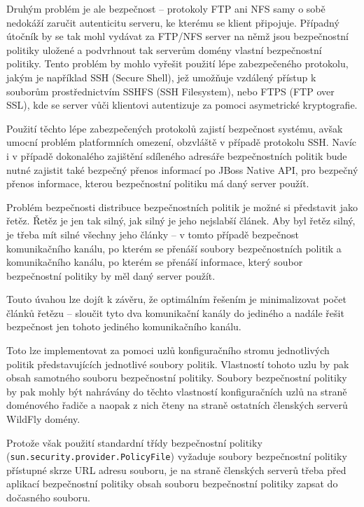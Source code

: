 Druhým problém je ale bezpečnost -- protokoly FTP ani NFS samy o sobě nedokáží zaručit autenticitu serveru, ke kterému se klient připojuje. Případný útočník by se tak mohl vydávat za FTP/NFS server na němž jsou bezpečnostní politiky uložené a podvrhnout tak serverům domény vlastní bezpečnostní politiky. Tento problém by mohlo vyřešit použití lépe zabezpečeného protokolu, jakým je například SSH (Secure Shell), jež umožňuje vzdálený přístup k souborům prostřednictvím SSHFS (SSH Filesystem), nebo FTPS (FTP over SSL), kde se server vůči klientovi autentizuje za pomoci asymetrické kryptografie. \cite[3]{ssh}

Použití těchto lépe zabezpečených protokolů zajistí bezpečnost systému, avšak umocní problém platformních omezení, obzvláště v případě protokolu SSH. Navíc i v případě dokonalého zajištění sdíleného adresáře bezpečnostních politik bude nutné zajistit také bezpečný přenos informací po JBoss Native API, pro bezpečný přenos informace, kterou bezpečnostní politiku má daný server použít.

Problém bezpečnosti distribuce bezpečnostních politik je možné si představit jako řetěz. Řetěz je jen tak silný, jak silný je jeho nejslabší článek. Aby byl řetěz silný, je třeba mít silné všechny jeho články -- v tomto případě bezpečnost komunikačního kanálu, po kterém se přenáší soubory bezpečnostních politik a komunikačního kanálu, po kterém se přenáší informace, který soubor bezpečnostní politiky by měl daný server použít.

Touto úvahou lze dojít k závěru, že optimálním řešením je minimalizovat počet článků řetězu -- sloučit tyto dva komunikační kanály do jediného a nadále řešit bezpečnost jen tohoto jediného komunikačního kanálu.

Toto lze implementovat za pomoci uzlů konfiguračního stromu jednotlivých politik představujících jednotlivé soubory politik. Vlastností tohoto uzlu by pak obsah samotného souboru bezpečnostní politiky. Soubory bezpečnostní politiky by pak mohly být nahrávány do těchto vlastností konfiguračních uzlů na straně doménového řadiče a naopak z nich čteny na straně ostatních členských serverů WildFly domény.

Protože však použití standardní třídy bezpečnostní politiky ({\tt sun.security.provider.PolicyFile}) vyžaduje soubory bezpečnostní politiky přístupné skrze URL adresu souboru, je na straně členských serverů třeba před aplikací bezpečnostní politiky obsah souboru bezpečnostní politiky zapsat do dočasného souboru.

